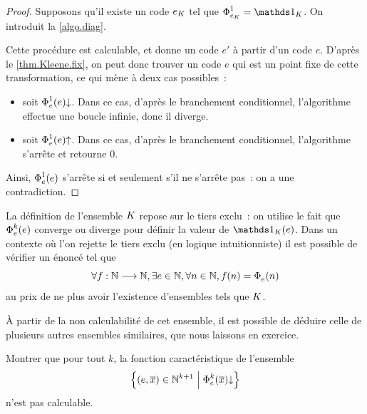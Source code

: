 \begin{proof}
  Supposons qu'il existe un code $e_{K}$ tel que
  $\EnumP{e_{\KH}}{1} = \indicP{\KH}$. On introduit la \cref{algo.diag}.
  
  \begin{algorithm}[t]
    \caption{Algorithme diagonal}
    \label{algo.diag}
  \end{algorithm}

  Cette procédure est calculable, et donne un code $e'$ à partir d'un code $e$.
  D'après le \cref{thm.Kleene.fix}, on peut donc trouver un code $e$ qui est
  un point fixe de cette transformation, ce qui mène à deux cas possibles~:
  \begin{itemize}
  \item soit $\operatorname{\Phi}_{e}^{1}(e)\mathbin{\downarrow}$. Dans ce cas, d'après le branchement
    conditionnel, l'algorithme effectue une boucle infinie, donc il diverge.
  \item soit $\operatorname{\Phi}_{e}^{1}(e)\mathbin{\uparrow}$. Dans ce cas, d'après le branchement
    conditionnel, l'algorithme s'arrête et retourne $0$.
  \end{itemize}
  Ainsi, $\operatorname{\Phi}_{e}^{1}(e)$ s'arrête si et seulement s'il ne s'arrête pas~: on a
  une contradiction.
\end{proof}

\begin{remark}
  La définition de l'ensemble $K$ repose sur le tiers exclu~: on utilise le
  fait que $\operatorname{\Phi}_{e}^{k}(e)$ converge ou diverge pour définir la valeur de
  $\indicP{\KH}(e)$. Dans un contexte où l'on rejette le tiers exclu (en logique
  intuitionniste) il est possible de vérifier un énoncé tel que
  \[\forall f : \displaystyle \mathbb N \longrightarrow \mathbb N, \exists e \in \mathbb N, \forall n \in \mathbb N,
  f(n) = \operatorname{\Phi}_{e}^{}(n)\]
  au prix de ne plus avoir l'existence d'ensembles tels que $K$.
\end{remark}

\`A partir de la non calculabilité de cet ensemble, il est possible de déduire
celle de plusieurs autres ensembles similaires, que nous laissons en exercice.

\begin{exercise}
  Montrer que pour tout $k$, la fonction caractéristique de l'ensemble
  \[\left\{ (e,\overline{x}) \in \mathbb N^{k+1} \;\middle\vert\; \operatorname{\Phi}_{e}^{k}(\overline{x})\mathbin{\downarrow} \right\}\]
  n'est pas calculable.
\end{exercise}

